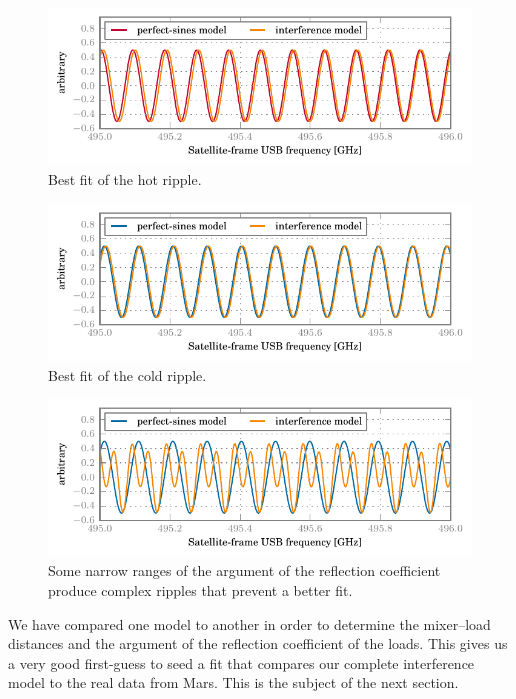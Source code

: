 \begin{figure}[hbtp]
    \centering
    \includegraphics{mars_25_interf_distance_fit_hot}
    \caption{Best fit of the hot ripple.}
    \label{fig:mars_25_interf_distance_fit_hot}
\end{figure}
\begin{figure}[hbtp]
    \centering
    \includegraphics{mars_25_interf_distance_fit_cold}
    \caption{Best fit of the cold ripple.}
    \label{fig:mars_25_interf_distance_fit_cold}
\end{figure}
\begin{figure}[hbtp]
    \centering
    \includegraphics{mars_25_interf_distance_fit_cold_poor}
    \caption{Some narrow ranges of the argument of the reflection coefficient produce complex ripples that prevent a better fit.}
    \label{fig:mars_25_interf_distance_fit_cold_poor}
\end{figure}

We have compared one model to another in order to determine the mixer--load distances
and the argument of the reflection coefficient of the loads.
This gives us a very good first-guess to seed a fit that compares our complete interference model to the real data from Mars.
This is the subject of the next section.






